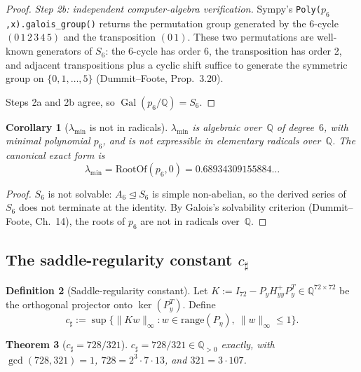 \documentclass[11pt]{article}
\newtheorem{theorem}{Theorem}[section]
\newtheorem{corollary}[theorem]{Corollary}
\theoremstyle{definition}
\newtheorem{definition}[theorem]{Definition}
\newcommand{\Q}{\mathbb{Q}}
\newcommand{\Gal}{\operatorname{Gal}}
\begin{document}
\begin{proof}
\emph{Step 2b: independent computer-algebra verification.}  Sympy's
\texttt{Poly($p_6$,x).galois\_group()} returns the permutation group
generated by the $6$-cycle $(0\,1\,2\,3\,4\,5)$ and the transposition
$(0\,1)$.  These two permutations are well-known generators of $S_6$:
the 6-cycle has order 6, the transposition has order 2, and adjacent
transpositions plus a cyclic shift suffice to generate the symmetric
group on $\{0,1,\ldots,5\}$ \textup{(}Dummit--Foote, Prop.~3.20\textup{)}.

Steps 2a and 2b agree, so $\Gal(p_6/\Q) = S_6$.
\end{proof}

\begin{corollary}[$\lambda_{\min}$ is not in radicals]\label{cor:noradical}
$\lambda_{\min}$ is algebraic over~$\Q$ of degree~$6$, with minimal
polynomial $p_6$, and is \emph{not} expressible in elementary
radicals over~$\Q$.  The canonical exact form is
\[
\lambda_{\min}=\mathrm{RootOf}(p_6,0)=0.68934309155884\ldots
\]
\end{corollary}

\begin{proof}
$S_6$ is not solvable: $A_6\trianglelefteq S_6$ is simple
non-abelian, so the derived series of $S_6$ does not terminate at
the identity.  By Galois's solvability criterion (Dummit--Foote,
Ch.~14), the roots of $p_6$ are not in radicals over~$\Q$.
\end{proof}

\subsection{The saddle-regularity constant $c_\sharp$}

\begin{definition}[Saddle-regularity constant]
Let $K:=I_{72}-P_y H_{yy}^+ P_y^T\in\Q^{72\times 72}$ be the
orthogonal projector onto $\ker(P_y^T)$.  Define
\begin{equation}\label{eq:csharp-def}
c_\sharp:=\sup\bigl\{\|Kw\|_\infty :
w\in\mathrm{range}(P_\eta),\ \|w\|_\infty\le 1\bigr\}.
\end{equation}
\end{definition}

\begin{theorem}[$c_\sharp=728/321$]\label{thm:csharp}
$c_\sharp=728/321\in\Q_{>0}$ exactly, with $\gcd(728,321)=1$,
$728=2^3\cdot 7\cdot 13$, and $321=3\cdot 107$.
\end{theorem}
\end{document}
